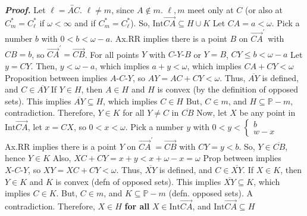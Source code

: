 \documentclass{report}
\begin{document}
\begin{itemize}
            \bigbreak \noindent 
            \textbf{\textit{Proof.}} Let $\ell = \overleftrightarrow{AC}$. $\ell \ne m$, since $A \not\in m$. $\ell, m$ meet only at $C$ (or also at $C_{m}^{*} = C_{\ell}^{*} $ if $\omega < \infty $ and if $C_{m}^{*} = C_{\ell}^{*} $). So, $\text{Int}\overrightarrow{CA} \subseteq H \cup K $
            \bigbreak \noindent 
            Let $CA = a < \omega$. Pick a number $b$ with $0 < b < \omega - a$. Ax.RR implies there is a point $B$ on $\overrightarrow{CA}^{\prime}$ with $CB = b$, so $\overrightarrow{CA}^{\prime} = \overrightarrow{CB} $.
            \bigbreak \noindent 
            For all points $Y$ with $ C\text{-}Y\text{-}B$ or $Y = B$, $CY \leq b < \omega - a$
            \bigbreak \noindent 
            Let $ y = CY$. Then, $y < \omega - a$, which implies $a+y < \omega$, which implies $CA + CY < \omega $
            \bigbreak \noindent 
            Proposition between implies $ A\text{-}C\text{-}Y$, so $ AY = AC + CY < \omega$. Thus, $\overline{AY}$ is defined, and $C \in \overline{AY} $
            \bigbreak \noindent 
            If $Y \in H$, then $A \in H$ and $H$ is convex (by the definition of opposed sets). This implies $\overline{AY} \subseteq H$, which implies $ C \in H $
            \bigbreak \noindent 
            But, $C \in m$, and $H \subseteq\mathbb{P}-m$, contradiction. Therefore, $Y \in K$ for all $Y \ne C$ in $\overline{CB} $
            \bigbreak \noindent 
            Now, let $X$ be any point in $\text{Int}\overrightarrow{CA}$, let $x = CX$, so $0 < x < \omega$. Pick a number $y$ with $0 < y < \begin{cases} b \\ w-x\end{cases} $
            \bigbreak \noindent 
            Ax.RR implies there is a point $Y$ on $\overrightarrow{CA}^{\prime} = \overrightarrow{CB}$ with $CY = y  < b$. So, $Y \in \overline{CB}$, hence $Y \in K $
            \bigbreak \noindent 
            Also, $XC  + CY = x + y  < x + \omega - x = \omega $
            \bigbreak \noindent 
            Prop between implies $ X\text{-}C\text{-}Y$, so $XY = XC  + CY < \omega $. Thus, $\overline{XY}$ is defined, and $C \in \overline{XY}$. 
            \bigbreak \noindent 
            If $X \in K$, then $Y \in K$ and $K$ is convex (defn of opposed sets). This implies $\overline{XY} \subseteq K$, which implies $C \in K$. But, $C \in m$, and $K \subseteq\mathbb{P} - m$ (defn. opposed sets). A contradiction.
            \bigbreak \noindent 
            Therefore, $X \in H$ \textbf{for all} $X \in \text{Int} \overrightarrow{CA} $, and $\text{Int}\overrightarrow{CA} \subseteq H$

\end{itemize}
\end{document}
